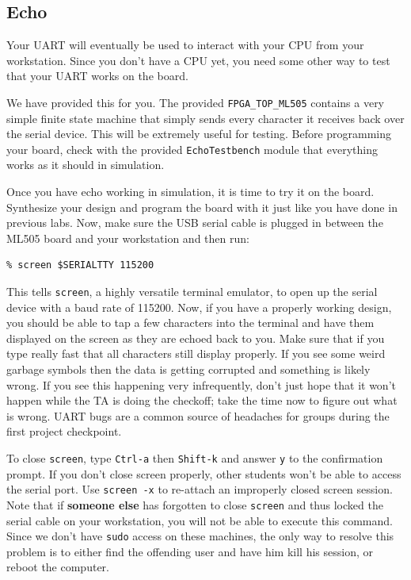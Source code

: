 \documentclass[11pt]{article}
\begin{document}
\subsection{Echo}
Your UART will eventually be used to interact with your CPU from your workstation. Since you don't have a CPU yet, you need some other way to test that your UART works on the board.

We have provided this for you. The provided \verb|FPGA_TOP_ML505| contains a very simple finite state machine that simply sends every character it receives back over the serial device. This will be extremely useful for testing. Before programming your board, check with the provided \verb|EchoTestbench| module that everything works as it should in simulation.

Once you have echo working in simulation, it is time to try it on the board. Synthesize your design and program the board with it just like you have done in previous labs. Now, make sure the USB serial cable is plugged in between the ML505 board and your workstation and then run:
\begin{verbatim}
% screen $SERIALTTY 115200
\end{verbatim}
This tells \verb|screen|, a highly versatile terminal emulator, to open up the serial device with a baud rate of 115200. Now, if you have a properly working design, you should be able to tap a few characters into the terminal and have them displayed on the screen as they are echoed back to you. Make sure that if you type really fast that all characters still display properly. If you see some weird garbage symbols then the data is getting corrupted and something is likely wrong. If you see this happening very infrequently, don't just hope that it won't happen while the TA is doing the checkoff; take the time now to figure out what is wrong. UART bugs are a common source of headaches for groups during the first project checkpoint. 

To close \verb|screen|, type \verb|Ctrl-a| then \verb|Shift-k| and answer \verb|y| to the confirmation prompt. If you don't close screen properly, other students won't be able to access the serial port. Use \verb|screen -x| to re-attach an improperly closed screen session. Note that if \textbf{someone else} has forgotten to close \verb|screen| and thus locked the serial cable on your workstation, you will not be able to execute this command. Since we don’t have \verb|sudo| access on these machines, the only way to resolve this problem is to either find the offending user and have him kill his session, or reboot the computer.
\end{document}
